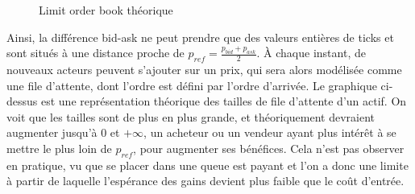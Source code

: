 \documentclass[12pt,a4paper]{article}
\theoremstyle{definition}
\theoremstyle{remark}
\begin{document}
    \begin{figure}[h!]
        \centering
        \caption{Limit order book théorique}
    \end{figure}
Ainsi, la différence bid-ask ne peut prendre que des valeurs entières de ticks et sont situés à une distance proche de $p_{ref} = \frac{p_{bid}+p_{ask}}{2}$. À chaque instant, de nouveaux acteurs peuvent s'ajouter sur un prix, qui sera alors modélisée comme une file d'attente, dont l'ordre est défini par l'ordre d'arrivée. Le graphique ci-dessus est une représentation  théorique des tailles de file d'attente d'un actif. On voit que les tailles sont de plus en plus grande, et théoriquement devraient augmenter jusqu'à 0 et $+\infty$, un acheteur ou un vendeur ayant plus intérêt à se mettre le plus loin de $p_{ref}$, pour augmenter ses bénéfices. Cela n'est pas observer en pratique, vu que se placer dans une queue est payant et l'on a donc une limite à partir de laquelle l’espérance des gains devient plus faible que le coût d'entrée.
\end{document}
